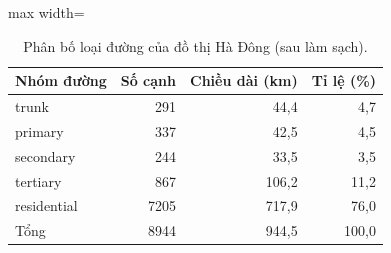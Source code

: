 \begin{table}[!htbp]
\centering
\small
\caption{Phân bố loại đường của đồ thị Hà Đông (sau làm sạch).}
\label{tab:tab_graph_groups}
\begin{adjustbox}{max width=\linewidth}
\begin{tabular}{lrrr}
\toprule
Nhóm đường & Số cạnh & Chiều dài (km) & Tỉ lệ (\%) \\
\midrule
trunk & 291 & 44{,}4 & 4{,}7 \\
primary & 337 & 42{,}5 & 4{,}5 \\
secondary & 244 & 33{,}5 & 3{,}5 \\
tertiary & 867 & 106{,}2 & 11{,}2 \\
residential & 7205 & 717{,}9 & 76{,}0 \\
Tổng & 8944 & 944{,}5 & 100{,}0 \\
\bottomrule
\end{tabular}
\end{adjustbox}
\end{table}
